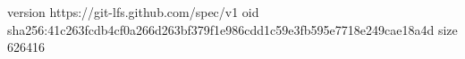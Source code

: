 version https://git-lfs.github.com/spec/v1
oid sha256:41c263fcdb4cf0a266d263bf379f1e986cdd1c59e3fb595e7718e249cae18a4d
size 626416
